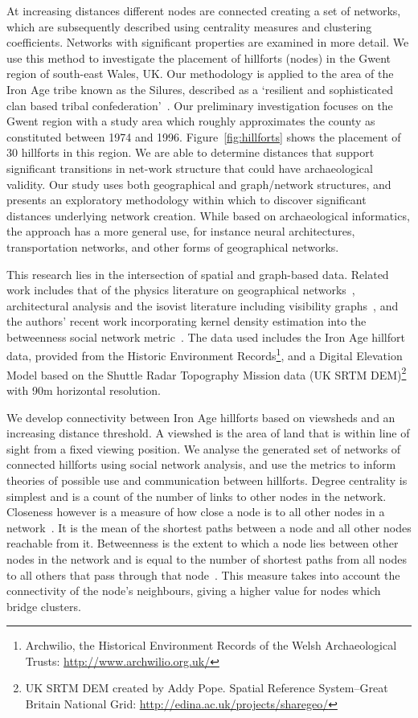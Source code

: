 \documentclass[11pt]{article}
\begin{document}
At increasing distances different nodes are connected creating a set
of networks, which are subsequently described using centrality
measures and clustering coefficients. Networks with significant
properties are examined in more detail. We use this method to
investigate the placement of hillforts (nodes) in the Gwent region of
south-east Wales, UK. Our methodology is applied to the area of the
Iron Age tribe known as the Silures, described as a `resilient and
sophisticated clan based tribal
confederation'~\citep{howell:2009}. Our preliminary investigation
focuses on the Gwent region with a study area which roughly
approximates the county as constituted between 1974 and 1996.
Figure~\ref{fig:hillforts} shows the placement of 30 hillforts in this
region. We are able to determine distances that support significant
transitions in net-work structure that could have archaeological
validity.  Our study uses both geographical and graph/network
structures, and presents an exploratory methodology within which to
discover significant distances underlying network creation. While
based on archaeological informatics, the approach has a more general
use, for instance neural architectures, transportation networks, and
other forms of geographical networks.

This research lies in the intersection of spatial and graph-based
data. Related work includes that of the physics literature on
geographical networks~\citep{ben-avraham-et-al:2003}, architectural
analysis and the isovist literature including visibility
graphs~\citep{steadman:1973,llobera:1996,turner-et-al:2001}, and the
authors' recent work incorporating kernel density estimation into the
betweenness social network
metric~\citep{oatley+crick_asonam2014,oatley+crick_fosintsi2014}. The
data used includes the Iron Age hillfort data, provided from the
Historic Environment Records\footnote{Archwilio, the Historical
Environment Records of the Welsh Archaeological Trusts:
\url{http://www.archwilio.org.uk/}}, and a Digital Elevation Model
based on the Shuttle Radar Topography Mission data (UK SRTM
DEM)\footnote{UK SRTM DEM created by Addy Pope. Spatial Reference
System--Great Britain National Grid:
\url{http://edina.ac.uk/projects/sharegeo/}} with 90m horizontal
resolution.

We develop connectivity between Iron Age hillforts based on viewsheds
and an increasing distance threshold. A viewshed is the area of land
that is within line of sight from a fixed viewing position. We analyse
the generated set of networks of connected hillforts using social
network analysis, and use the metrics to inform theories of possible
use and communication between hillforts.  Degree centrality is
simplest and is a count of the number of links to other nodes in the
network. Closeness however is a measure of how close a node is to all
other nodes in a network~\citep{sabidussi:1966}. It is the mean of the
shortest paths between a node and all other nodes reachable from
it. Betweenness is the extent to which a node lies between other nodes
in the network and is equal to the number of shortest paths from all
nodes to all others that pass through that
node~\citep{freeman:1977}. This measure takes into account the
connectivity of the node's neighbours, giving a higher value for nodes
which bridge clusters.
\end{document}
